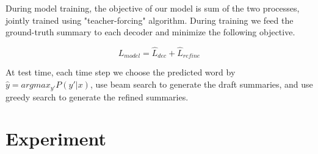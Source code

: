 \documentclass{article}
\begin{document}
During model training, the objective of our model is sum of the two processes, jointly trained using "teacher-forcing" algorithm. During training we feed the ground-truth summary to each decoder and minimize the following objective.

\begin{equation}
    L_{model} = \hat L_{dec} + \hat L_{refine}
\end{equation}

At test time, each time step we choose the predicted word by $\hat y = argmax_{y'} P(y'|x)$, use beam search to generate the draft summaries, and use greedy search to generate the refined summaries.

\section{Experiment}
\end{document}
